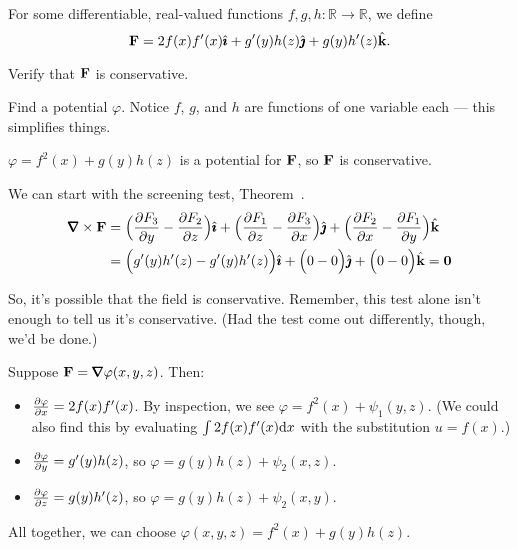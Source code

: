 \begin{question}
For some differentiable, real-valued functions $f,g,h:\mathbb R \to \mathbb R$, we define 
\[\mathbf{F}=2f(x)f'(x)\hat{\pmb{\imath}}+g'(y)h(z)\hat{\pmb{\jmath}}+g(y)h'(z)\hat{\mathbf{k}}.\]

Verify that $\mathbf{F}$ is conservative.

\end{question}
\begin{hint}
Find a potential $\varphi$. Notice $f$, $g$, and $h$ are functions of one variable each --- this simplifies things.
\end{hint}
\begin{answer}
$\varphi=f^2(x)+g(y)h(z)$ is a potential for $\mathbf{F}$, so $\mathbf{F}$ is conservative.
\end{answer}
\begin{solution}

We can start with the screening test, Theorem~.
\begin{align*}
\mathbf\vnabla \times \vF &=\Big(\pdiff{F_3}{y} -\pdiff{F_2}{z} \Big)\hi
+\Big(\pdiff{F_1}{z} -\pdiff{F_3}{x} \Big)\hj
+\Big(\pdiff{F_2}{x} -\pdiff{F_1}{y} \Big)\hk\\
&=\Big(g'(y)h'(z)-g'(y)h'(z) \Big)\hi
+\Big(0 -0 \Big)\hj
+\Big(0 -0 \Big)\hk=\mathbf{0}
\end{align*}

So, it's possible that the field is conservative. Remember, this test alone isn't enough to tell us it's conservative. (Had the test come out differently, though, we'd be done.)

Suppose $\vF=\vnabla\varphi(x,y,z)$. Then:
\begin{itemize}
\item $\pdiff{\varphi}{x} = 2f(x)f'(x) $. By inspection, we see $\varphi = f^2(x)+ \psi_1(y,z)$. (We could also find this by evaluating $\int 2f(x)f'(x)\mathrm{d}x$ with the substitution $u=f(x)$.)
\item $\pdiff{\varphi}{y} =  g'(y)h(z)$, so $\varphi=g(y)h(z)+\psi_2(x,z)$.
\item $\pdiff{\varphi}{z} =  g(y)h'(z)$, so $\varphi=g(y)h(z)+\psi_2(x,y)$.
\end{itemize}
All together, we can choose $\varphi(x,y,z) = f^2(x)+g(y)h(z)$.

\end{solution}


